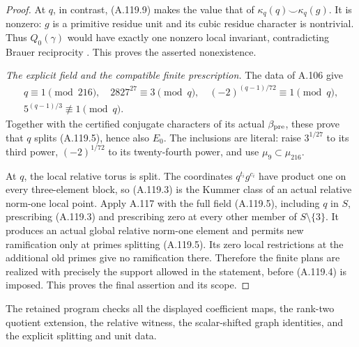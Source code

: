 \begin{proof}
At \(q\), in contrast, (A.119.9) makes the value
that of \(\kappa_q(q)\smile\kappa_q(g)\).
It is nonzero: \(g\) is a primitive residue unit
and its cubic residue character is nontrivial.
Thus \(Q_0(\gamma)\) would have exactly one
nonzero local invariant, contradicting Brauer
reciprocity
\cite[I, Theorem 4.10(b)]{BIR_MilneADT}.
This proves the asserted nonexistence.

\emph{The explicit field and the compatible finite prescription.}
The data of A.106 give
\[
 \begin{gathered}
 q\equiv1\pmod{216},\quad
 2827^{27}\equiv3\pmod q,\quad
 (-2)^{(q-1)/72}\equiv1\pmod q,\\
 5^{(q-1)/3}\not\equiv1\pmod q.
 \end{gathered}
 \tag{A.119.16}
\]
Together with the certified conjugate characters
of its actual \(\beta_{\rm pre}\), these prove
that \(q\) splits (A.119.5), hence also \(E_0\).
The inclusions are literal:
raise \(3^{1/27}\) to its third power,
\((-2)^{1/72}\) to its twenty-fourth power,
and use \(\mu_9\subset\mu_{216}\).

At \(q\), the local relative torus is split.
The coordinates \(q^{t_i}g^{c_i}\) have product
one on every three-element block, so (A.119.3)
is the Kummer class of an actual relative
norm-one local point.
Apply A.117 with the full field (A.119.5),
including \(q\) in \(S\), prescribing (A.119.3)
and prescribing zero at every other member
of \(S\setminus\{3\}\).
It produces an actual global relative norm-one
element and permits new ramification only at
primes splitting (A.119.5).
Its zero local restrictions at the additional
old primes give no ramification there.
Therefore the finite plans are realized with
precisely the support allowed in the statement,
before (A.119.4) is imposed.
This proves the final assertion and its scope.
\end{proof}

The retained program
checks all the displayed coefficient maps, the
rank-two quotient extension, the relative witness,
the scalar-shifted graph identities, and the
explicit splitting and unit data.
